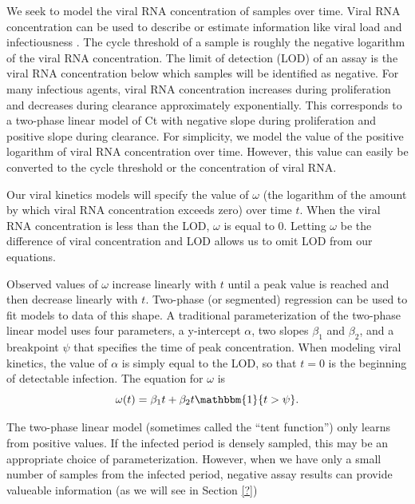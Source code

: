 \documentclass[11pt,notitlepage]{article}
\begin{document}
We seek to model the viral RNA concentration of samples over time.
Viral RNA concentration can be used to describe or estimate information like viral load and infectiousness  \cite{tom2020interpret}.
The cycle threshold of a sample is roughly the negative logarithm of the viral RNA concentration.
The limit of detection (LOD) of an assay is the viral RNA concentration below which samples will be identified as negative.
For many infectious agents, viral RNA concentration increases during proliferation and decreases during clearance approximately exponentially.
This corresponds to a two-phase linear model of Ct with negative slope during proliferation and positive slope during clearance.
For simplicity, we model the value of the positive logarithm of viral RNA concentration over time.
However, this value can easily be converted to the cycle threshold or the concentration of viral RNA.

Our viral kinetics models will specify the value of $\omega$ (the logarithm of the amount by which viral RNA concentration exceeds zero) over time $t$.
When the viral RNA concentration is less than the LOD, $\omega$ is equal to 0.
Letting $\omega$ be the difference of viral concentration and LOD allows us to omit LOD from our equations.

Observed values of $\omega$ increase linearly with $t$ until a peak value is reached and then decrease linearly with $t$.
Two-phase (or segmented) regression can be used to fit models to data of this shape.
A traditional parameterization of the two-phase linear model uses four parameters, a y-intercept $\alpha$, two slopes $\beta_1$ and $\beta_2$, and a breakpoint $\psi$ that specifies the time of peak concentration.
When modeling viral kinetics, the value of $\alpha$ is simply equal to the LOD, so that $t = 0$ is the beginning of detectable infection.
The equation for $\omega$ is
\begin{equation*}
    \omega(t) = \beta_1 t + \beta_2 t \mathbbm{1}\{t > \psi\}.
\end{equation*}

The two-phase linear model (sometimes called the ``tent function'') only learns from positive values.
If the infected period is densely sampled, this may be an appropriate choice of parameterization.
However, when we have only a small number of samples from the infected period, negative assay results can provide valueable information (as we will see in Section \ref{?}) 
\end{document}
